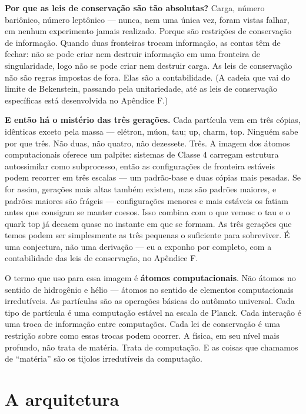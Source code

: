 \documentclass[11pt, twoside, openright]{book}
\begin{document}
\textbf{Por que as leis de conservação são tão absolutas?} Carga, número bariônico, número leptônico --- nunca, nem uma única vez, foram vistas falhar, em nenhum experimento jamais realizado. Porque são restrições de conservação de informação. Quando duas fronteiras trocam informação, as contas têm de fechar: não se pode criar nem destruir informação em uma fronteira de singularidade, logo não se pode criar nem destruir carga. As leis de conservação não são regras impostas de fora. Elas são a contabilidade. (A cadeia que vai do limite de Bekenstein, passando pela unitariedade, até as leis de conservação específicas está desenvolvida no Apêndice F.)

\textbf{E então há o mistério das três gerações.} Cada partícula vem em três cópias, idênticas exceto pela massa --- elétron, múon, tau; up, charm, top. Ninguém sabe por que três. Não duas, não quatro, não dezessete. Três. A imagem dos átomos computacionais oferece um palpite: sistemas de Classe 4 carregam estrutura autossimilar como subprocesso, então as configurações de fronteira estáveis podem recorrer em três escalas --- um padrão-base e duas cópias mais pesadas. Se for assim, gerações mais altas também existem, mas são padrões maiores, e padrões maiores são frágeis --- configurações menores e mais estáveis os fatiam antes que consigam se manter coesos. Isso combina com o que vemos: o tau e o quark top já decaem quase no instante em que se formam. As três gerações que temos podem ser simplesmente as três pequenas o suficiente para sobreviver. É uma conjectura, não uma derivação --- eu a exponho por completo, com a contabilidade das leis de conservação, no Apêndice F.

O termo que uso para essa imagem é \textbf{átomos computacionais}. Não átomos no sentido de hidrogênio e hélio --- átomos no sentido de elementos computacionais irredutíveis. As partículas são as operações básicas do autômato universal. Cada tipo de partícula é uma computação estável na escala de Planck. Cada interação é uma troca de informação entre computações. Cada lei de conservação é uma restrição sobre como essas trocas podem ocorrer. A física, em seu nível mais profundo, não trata de matéria. Trata de computação. E as coisas que chamamos de ``matéria'' são os tijolos irredutíveis da computação.


\section*{A arquitetura}
\end{document}
